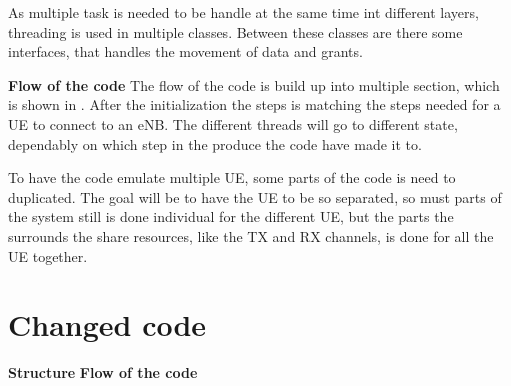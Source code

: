 

As multiple task is needed to be handle at the same time int different layers, threading is used in multiple classes.  Between these classes are there some interfaces, that handles the movement of data and grants.

\textbf{Flow of the code}
The flow of the code is build up into multiple section, which is shown in . After the initialization the steps is matching the steps needed for a UE to connect to an eNB. The different threads will go to different state, dependably on which step in the produce the code have made it to.



To have the code emulate multiple UE, some parts of the code is need to duplicated. The goal will be to have the UE to be so separated, so must parts of the system still is done individual for the different UE, but the parts the surrounds the share resources, like the TX and RX channels, is done for all the UE together.

\section{Changed code}

\textbf{Structure}
\textbf{Flow of the code}